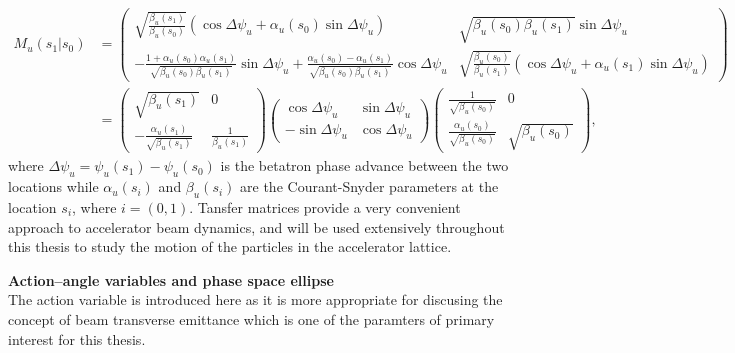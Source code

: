 \begin{equation}\label{eq:linear_transfer_matrix}
    \begin{split}
    M_u (s_1 |  s_0) &= \begin{pmatrix}
        \sqrt{\frac{\beta_u(s_1)}{\beta_u(s_0)}} (\cos{\Delta \psi_u}+\alpha_u (s_0) \sin{\Delta \psi_u}) & \sqrt{\beta_u(s_0)\beta_u(s_1)}\sin{\Delta \psi_u} \\ 
         - \frac{1+\alpha_u(s_0) \alpha_u(s_1)}{\sqrt{\beta_u(s_0) \beta_u(s_1)}} \sin{\Delta \psi_u}+ \frac{\alpha_u(s_0) - \alpha_u(s_1)}{\sqrt{\beta_u(s_0) \beta_u(s_1)}} \cos{\Delta \psi_u} & \sqrt{\frac{\beta_u(s_0)}{\beta_u(s_1)}} (\cos{\Delta \psi_u}+\alpha_u(s_1) \sin{\Delta \psi_u})
        \end{pmatrix} \\ 
        &=\begin{pmatrix}
            \sqrt{\beta_u(s_1)} & 0 \\
            -\frac{\alpha_u(s_1)}{\sqrt{\beta_u(s_1)}}& \frac{1}{\beta_u(s_1)}
            \end{pmatrix} \begin{pmatrix}
            \cos{\Delta \psi_u} & \sin{\Delta \psi_u} \\
            -\sin{\Delta \psi_u}& \cos{\Delta \psi_u}
            \end{pmatrix} \begin{pmatrix}
            \frac{1}{\sqrt{\beta_u(s_0)}} & 0 \\
            \frac{\alpha_u(s_0)}{\sqrt{\beta_u(s_0)}} & \sqrt{\beta_u(s_0)}
            \end{pmatrix},
    \end{split}
\end{equation}
where $\Delta \psi_u = \psi_u(s_1)-\psi_u(s_0)$ is the betatron phase advance between the two locations while $\alpha_u(s_i)$ and $\beta_u(s_i)$ are the Courant-Snyder parameters at the location $s_i$, where $i=(0,1)$. Tansfer matrices provide a very convenient approach to accelerator beam dynamics, and will be used extensively throughout this thesis to study the motion of the particles in the accelerator lattice.

\textbf{Action--angle variables and phase space ellipse}\\
The action variable is introduced here as it is more appropriate for discusing the concept of beam transverse emittance which is one of the paramters of primary interest for this thesis. %

